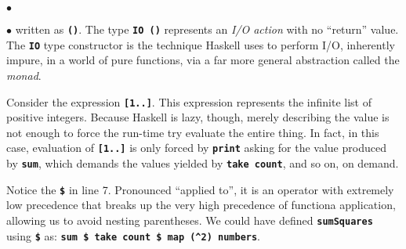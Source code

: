 \documentclass[12pt]{article}
\newcommand\codebold[1]{\texttt{\textbf{#1}}}
\newenvironment{notelist}{\begin{list}
   {$\bullet$}
   {\setlength{\itemsep}{0in}}}
   {\end{list}}
\begin{document}
\begin{notelist}
\begin{notelist}
          written as \codebold{()}. The type \codebold{IO ()} represents an \textit{I/O action} with no ``return''
          value. The \codebold{IO} type constructor is the technique Haskell uses to perform I/O, inherently impure,
          in a world of pure functions, via a far more general abstraction called the \textit{monad}.
    \item Consider the expression \codebold{[1..]}. This expression represents the infinite list of positive
          integers. Because Haskell is lazy, though, merely describing the value is not enough to force the run-time try
          evaluate the entire thing. In fact, in this case, evaluation of \codebold{[1..]} is only forced by
          \codebold{print} asking for the value produced by \codebold{sum}, which demands the values yielded by
          \codebold{take count}, and so on, on demand.
    \item Notice the \codebold{\$} in line 7. Pronounced ``applied to'', it is an operator with extremely low
          precedence that breaks up the very high precedence of functiona application, allowing us to avoid nesting
          parentheses. We could have defined \codebold{sumSquares} using \codebold{\$} as:
          \codebold{sum \$ take count \$ map (\string^2) numbers}. 
\end{notelist}
\end{notelist}
\end{document}
